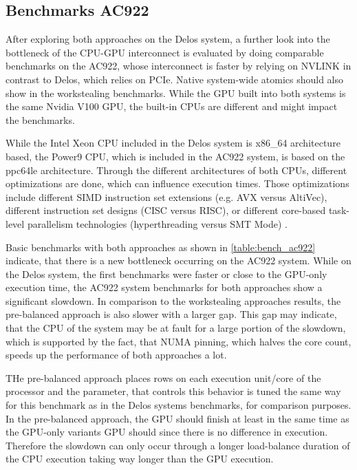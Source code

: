 \subsection{Benchmarks AC922}
After exploring both approaches on the Delos system, a further look into the bottleneck of the CPU-GPU interconnect is evaluated by doing comparable benchmarks on the AC922, whose interconnect is faster by relying on NVLINK in contrast to Delos, which relies on PCIe. Native system-wide atomics should also show in the workstealing benchmarks.
While the GPU built into both systems is the same Nvidia V100 GPU, the built-in CPUs are different and might impact the benchmarks.

While the Intel Xeon CPU included in the Delos system is x86\_64 architecture based, the Power9 CPU, which is included in the AC922 system, is based on the ppc64le architecture. Through the different architectures of both CPUs, different optimizations are done, which can influence execution times. Those optimizations include different SIMD instruction set extensions (e.g. AVX versus AltiVec), different instruction set designs (CISC versus RISC), or different core-based task-level parallelism technologies (hyperthreading versus SMT Mode) \cite{AnalysisX86Vs}.



Basic benchmarks with both approaches as shown in \ref{table:bench_ac922} indicate, that there is a new bottleneck occurring on the AC922 system. While on the Delos system, the first benchmarks were faster or close to the GPU-only execution time, the AC922 system  benchmarks for both approaches show a significant slowdown. In comparison to the workstealing approaches results, the pre-balanced approach is also slower with a larger gap. This gap may indicate, that the CPU of the system may be at fault for a large portion of the slowdown, which is supported by the fact, that NUMA pinning, which halves the core count, speeds up the performance of both approaches a lot.

THe pre-balanced approach places rows on each execution unit/core of the processor and the parameter, that controls this behavior is tuned the same way for this benchmark as in the Delos systems benchmarks, for comparison purposes.
In the pre-balanced approach, the GPU should finish at least in the same time as the GPU-only variants GPU should since there is no difference in execution. Therefore the slowdown can only occur through a longer load-balance duration of the CPU execution taking way longer than the GPU execution.

